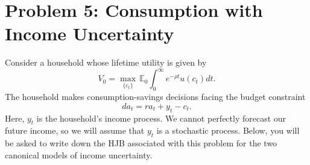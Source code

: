 \documentclass[11pt]{extarticle}
\theoremstyle{plain}
\theoremstyle{definition}
\begin{document}
\vspace{5mm}
\section*{Problem 5: Consumption with Income Uncertainty}

Consider a household whose lifetime utility is given by 
\begin{equation*}
	V_0 = \max_{ \{c_t\} } \, \mathbb E_0 \int_0^\infty e^{- \rho t} u(c_t) dt.
\end{equation*}
The household makes consumption-savings decisions facing the budget constraint 
\begin{equation*}
	da_t = r a_t + y_t - c_t.
\end{equation*}
Here, $y_t$ is the household's income process. We cannot perfectly forecast our future income, so we will assume that $y_t$ is a stochastic process. Below, you will be asked to write down the HJB associated with this problem for the two canonical models of income uncertainty.
\end{document}
